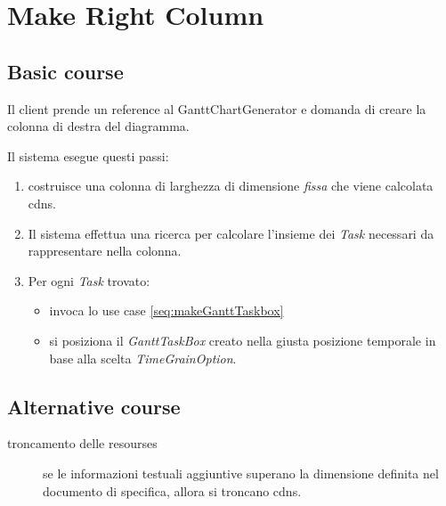 \section{Make Right Column}
\label{seq:GanttRightRepresentation}
\subsection{Basic course}
Il client prende un reference al GanttChartGenerator e domanda di creare la
colonna di destra del diagramma. 

Il sistema esegue questi passi:
\begin{enumerate}
  \item costruisce una colonna di larghezza di dimensione \emph{fissa} che
  viene calcolata cdns.
  \item Il sistema effettua una ricerca per calcolare l'insieme dei \emph{Task}
  necessari da rappresentare nella colonna.
  \item Per ogni \emph{Task} trovato:
  \begin{itemize}
    \item invoca lo use case \ref{seq:makeGanttTaskbox}
    
    \item si posiziona il \emph{GanttTaskBox} creato nella giusta posizione
    temporale in base alla scelta \emph{TimeGrainOption}.
  \end{itemize}
\end{enumerate}

\subsection{Alternative course}
\begin{description}
\item[troncamento delle resourses] se le informazioni testuali aggiuntive
superano la dimensione definita nel documento di specifica, allora si troncano
cdns.

\end{description}